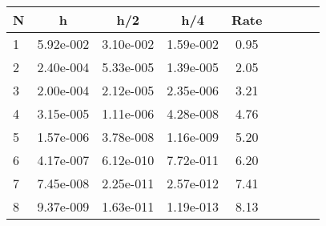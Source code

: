 \begin{tabular}{lcccccccc}
N & h & h/2 & h/4 & Rate\\
\hline
1& 5.92e-002& 3.10e-002& 1.59e-002& 0.95\\
2& 2.40e-004& 5.33e-005& 1.39e-005& 2.05\\
3& 2.00e-004& 2.12e-005& 2.35e-006& 3.21\\
4& 3.15e-005& 1.11e-006& 4.28e-008& 4.76\\
5& 1.57e-006& 3.78e-008& 1.16e-009& 5.20\\
6& 4.17e-007& 6.12e-010& 7.72e-011& 6.20\\
7& 7.45e-008& 2.25e-011& 2.57e-012& 7.41\\
8& 9.37e-009& 1.63e-011& 1.19e-013& 8.13\\
\hline
\end{tabular}
